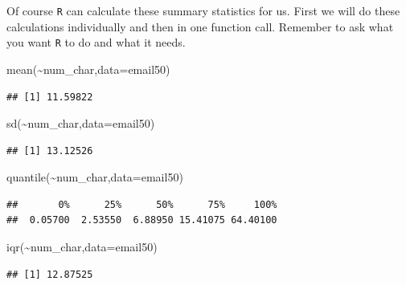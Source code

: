 \documentclass[
]{book}
\newenvironment{Shaded}{\begin{snugshade}}{\end{snugshade}}
\newcommand{\AttributeTok}[1]{\textcolor[rgb]{0.77,0.63,0.00}{#1}}
\newcommand{\FunctionTok}[1]{\textcolor[rgb]{0.00,0.00,0.00}{#1}}
\newcommand{\NormalTok}[1]{#1}
\newcommand{\SpecialCharTok}[1]{\textcolor[rgb]{0.00,0.00,0.00}{#1}}
\begin{document}
Of course \texttt{R} can calculate these summary statistics for us. First we will do these calculations individually and then in one function call. Remember to ask what you want \texttt{R} to do and what it needs.

\begin{Shaded}
\begin{Highlighting}[]
\FunctionTok{mean}\NormalTok{(}\SpecialCharTok{\textasciitilde{}}\NormalTok{num\_char,}\AttributeTok{data=}\NormalTok{email50)}
\end{Highlighting}
\end{Shaded}

\begin{verbatim}
## [1] 11.59822
\end{verbatim}

\begin{Shaded}
\begin{Highlighting}[]
\FunctionTok{sd}\NormalTok{(}\SpecialCharTok{\textasciitilde{}}\NormalTok{num\_char,}\AttributeTok{data=}\NormalTok{email50)}
\end{Highlighting}
\end{Shaded}

\begin{verbatim}
## [1] 13.12526
\end{verbatim}

\begin{Shaded}
\begin{Highlighting}[]
\FunctionTok{quantile}\NormalTok{(}\SpecialCharTok{\textasciitilde{}}\NormalTok{num\_char,}\AttributeTok{data=}\NormalTok{email50)}
\end{Highlighting}
\end{Shaded}

\begin{verbatim}
##       0%      25%      50%      75%     100% 
##  0.05700  2.53550  6.88950 15.41075 64.40100
\end{verbatim}

\begin{Shaded}
\begin{Highlighting}[]
\FunctionTok{iqr}\NormalTok{(}\SpecialCharTok{\textasciitilde{}}\NormalTok{num\_char,}\AttributeTok{data=}\NormalTok{email50)}
\end{Highlighting}
\end{Shaded}

\begin{verbatim}
## [1] 12.87525
\end{verbatim}
\end{document}
